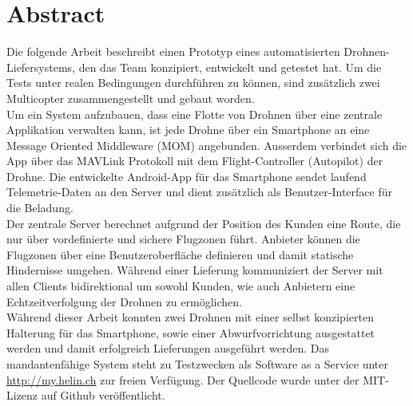 \newpage
\cleardoublepage
{}
{}
\chapter*{Abstract}

Die folgende Arbeit beschreibt einen Prototyp eines automatisierten Drohnen-Liefersystems, den das Team konzipiert, entwickelt und getestet hat. Um die Tests unter realen Bedingungen durchführen zu können, sind zusätzlich zwei Multicopter zusammengestellt und gebaut worden.\\

Um ein System aufzubauen, dass eine Flotte von Drohnen über eine zentrale Applikation verwalten kann, ist jede Drohne über ein Smartphone an eine Message Oriented Middleware (\Gls{MOM}) angebunden. Ausserdem verbindet sich die App über das \Gls{MAVLink} Protokoll mit dem \Gls{Flight-Controller} (Autopilot) der Drohne. 
Die entwickelte Android-App für das Smartphone sendet laufend Telemetrie-Daten an den Server und dient zusätzlich als Benutzer-Interface für die Beladung. \\

Der zentrale Server berechnet aufgrund der Position des Kunden eine Route, die nur über vordefinierte und sichere Flugzonen führt. Anbieter können die Flugzonen über eine Benutzeroberfläche definieren und damit statische Hindernisse umgehen. Während einer Lieferung kommuniziert der Server mit allen Clients bidirektional um sowohl Kunden, wie auch Anbietern eine Echtzeitverfolgung der Drohnen zu ermöglichen. \\

Während dieser Arbeit konnten zwei Drohnen mit einer selbst konzipierten Halterung für das Smartphone, sowie einer Abwurfvorrichtung ausgestattet werden und damit erfolgreich Lieferungen ausgeführt werden. Das mandantenfähige System steht zu Testzwecken als Software as a Service unter \url{http://my.helin.ch} zur freien Verfügung. Der Quellcode wurde unter der MIT-Lizenz auf Github veröffentlicht.
